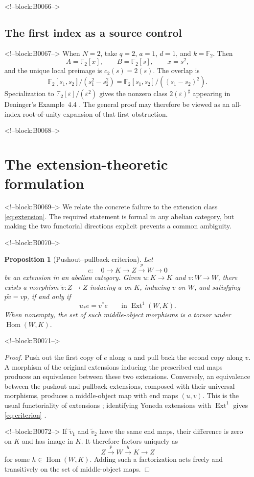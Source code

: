\documentclass[11pt]{article}
\newtheorem{proposition}[theorem]{Proposition}
\theoremstyle{definition}
\newcommand{\Ext}{\operatorname{Ext}}
\newcommand{\Hom}{\operatorname{Hom}}
\newcommand{\sh}{\sharp}
\begin{document}
<!--block:B0066-->
\subsection{The first index as a source control}

<!--block:B0067-->
When \(N=2\), take \(q=2\), \(a=1\), \(d=1\), and \(k=\mathbb F_2\).
Then
\[
 A=\mathbb F_2[x],\qquad B=\mathbb F_2[s],\qquad x=s^2,
\]
and the unique local preimage is \(c_2(s)=2(s)\).  The overlap is
\[
 \mathbb F_2[s_1,s_2]/(s_1^2-s_2^2)
  =\mathbb F_2[s_1,s_2]/((s_1-s_2)^2).
\]
Specialization to
\(\mathbb F_2[\varepsilon]/(\varepsilon^2)\) gives the nonzero class
\(2(\varepsilon)^\sh\) appearing in
Deninger's Example~4.4 \cite[p.~22]{Deninger2025Rational}.  The general
proof may therefore be viewed as an all-index root-of-unity expansion of
that first obstruction.

<!--block:B0068-->
\section{The extension-theoretic formulation}\label{sec:ext}

<!--block:B0069-->
We relate the concrete failure to the extension class
\eqref{eq:extension}.  The required statement is formal in any abelian
category, but making the two functorial directions explicit prevents a
common ambiguity.

<!--block:B0070-->
\begin{proposition}[Pushout--pullback criterion]\label{prop:extcriterion}
Let
\[
 e:\quad0\longrightarrow K\longrightarrow Z
   \xrightarrow{p}W\longrightarrow0
\]
be an extension in an abelian category.  Given
\(u\colon K\to K\) and \(v\colon W\to W\), there exists a morphism
\(\widetilde v\colon Z\to Z\) inducing \(u\) on \(K\), inducing \(v\) on
\(W\), and satisfying \(p\widetilde v=vp\), if and only if
\[
 u_*e=v^*e\qquad\text{in }\Ext^1(W,K).
 \tag{5.1}\label{eq:criterion}
\]
When nonempty, the set of such middle-object morphisms is a torsor under
\(\Hom(W,K)\).
\end{proposition}

<!--block:B0071-->
\begin{proof}
Push out the first copy of \(e\) along \(u\) and pull back the second copy
along \(v\).  A morphism of the original extensions inducing the prescribed
end maps produces an equivalence between these two extensions.  Conversely,
an equivalence between the pushout and pullback extensions, composed with
their universal morphisms, produces a middle-object map with end maps
\((u,v)\).  This is the usual functoriality of extensions
\cite[Tag 010I]{StacksProject}; identifying Yoneda extensions with
\(\Ext^1\) gives \eqref{eq:criterion}
\cite[Tag 06XP]{StacksProject}.

<!--block:B0072-->
If \(\widetilde v_1\) and \(\widetilde v_2\) have the same end maps, their
difference is zero on \(K\) and has image in \(K\).  It therefore factors
uniquely as
\[
 Z\xrightarrow{p}W\xrightarrow{h}K\longrightarrow Z
\]
for some \(h\in\Hom(W,K)\).  Adding such a factorization acts freely and
transitively on the set of middle-object maps.
\end{proof}
\end{document}
